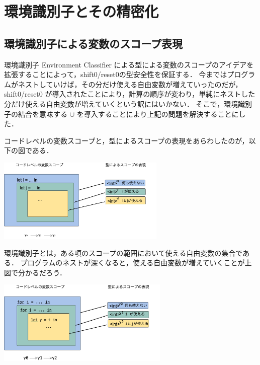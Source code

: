 
\section{環境識別子とその精密化}

\subsection{環境識別子による変数のスコープ表現}

環境識別子 Environment Classifier による型による変数のスコープのアイデア\cite{Taha:2003:EC:604131.604134,Sudo2014}を拡張することによって，shift0/reset0の型安全性を保証する．
今まではプログラムがネストしていけば，その分だけ使える自由変数が増えていったのだが， shift0/reset0 が導入されたことにより，計算の順序が変わり，単純にネストした分だけ使える自由変数が増えていくという訳にはいかない．
そこで，環境識別子の結合を意味する $\cup$ を導入することにより上記の問題を解決することにした．


コードレベルの変数スコープと，型によるスコープの表現をあらわしたのが，以下の図である．
\begin{center}
  \includegraphics[clip,height=4cm]{./img/ec_let.png}
\end{center}

環境識別子とは，ある項のスコープの範囲において使える自由変数の集合である．
プログラムのネストが深くなると，使える自由変数が増えていくことが上図で分かるだろう．

\begin{center}
  \includegraphics[clip,height=4cm]{./img/ec_for.png}
\end{center}


